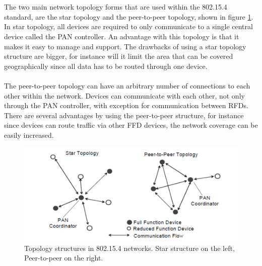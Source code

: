 \\\\
The two main network topology forms that are used within the 802.15.4 standard, are the star topology and the peer-to-peer topology, shown in figure \ref{fig:topology}. In star topology, all devices are required to only communicate to a single central device called the PAN controller. An advantage with this topology is that it makes it easy to manage and support. The drawbacks of using a star topology structure are bigger, for instance will it limit the area that can be covered geographically since all data has to be routed through one device.\\\\
The peer-to-peer topology can have an arbitrary number of connections to each other within the network. Devices can communicate with each other, not only through the PAN controller, with exception for communication between RFDs. There are several advantages by using the peer-to-peer structure, for instance since devices can route traffic via other FFD devices, the network coverage can be easily increased.\\


\begin{figure}
	\includegraphics[width=\textwidth]{figures/802-15-4-topologies.png}
	\caption{Topology structures in 802.15.4 networks. Star structure on the left, Peer-to-peer on the right.}
	\label{fig:topology}
\end{figure}


